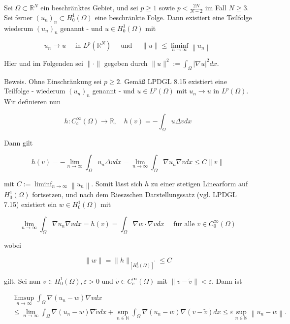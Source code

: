 \documentclass[10pt, letterpaper]{article}
\begin{document}
Sei $\Omega \subset \mathbb{R}^{N}$ ein beschränktes Gebiet, und sei $p \geq 1$ sowie $p<\frac{2 N}{N-2}$ im Fall $N \geq 3$. Sei ferner $\left(u_{n}\right)_{n} \subset H_{0}^{1}(\Omega)$ eine beschränkte Folge. Dann existiert eine Teilfolge wiederum $\left(u_{n}\right)_{n}$ genannt - und $u \in H_{0}^{1}(\Omega)$ mit

$$
u_{n} \rightarrow u \quad \text { in } L^{p}\left(\mathbb{R}^{N}\right) \quad \text { und } \quad\|u\| \leq \liminf _{n \rightarrow \infty}\left\|u_{n}\right\|
$$

Hier und im Folgenden sei $\|\cdot\|$ gegeben durch $\|u\|^{2}:=\int_{\Omega}|\nabla u|^{2} d x$.

Beweis. Ohne Einschränkung sei $p \geq 2$. Gemäß LPDGL 8.15 existiert eine Teilfolge - wiederum $\left(u_{n}\right)_{n}$ genannt - und $u \in L^{p}(\Omega)$ mit $u_{n} \rightarrow u$ in $L^{p}(\Omega)$. Wir definieren nun

$$
h: C_{c}^{\infty}(\Omega) \rightarrow \mathbb{R}, \quad h(v)=-\int_{\Omega} u \Delta v d x
$$

Dann gilt

$$
h(v)=-\lim _{n \rightarrow \infty} \int_{\Omega} u_{n} \Delta v d x=\lim _{n \rightarrow \infty} \int_{\Omega} \nabla u_{n} \nabla v d x \leq C\|v\|
$$

mit $C:=\liminf _{n \rightarrow \infty}\left\|u_{n}\right\|$. Somit lässt sich $h$ zu einer stetigen Linearform auf $H_{0}^{1}(\Omega)$ fortsetzen, und nach dem Rieszschen Darstellungssatz (vgl. LPDGL 7.15) existiert ein $w \in H_{0}^{1}(\Omega)$ mit

$$
\lim _{n \rightarrow \infty} \int_{\Omega} \nabla u_{n} \nabla v d x=h(v)=\int_{\Omega} \nabla w \cdot \nabla v d x \quad \text { für alle } v \in C_{0}^{\infty}(\Omega)
$$

wobei

$$
\|w\|=\|h\|_{\left[H_{0}^{1}(\Omega)\right]^{\prime}} \leq C
$$

gilt. Sei nun $v \in H_{0}^{1}(\Omega), \varepsilon>0$ und $\tilde{v} \in C_{c}^{\infty}(\Omega)$ mit $\|v-\tilde{v}\|<\varepsilon$. Dann ist

$$
\begin{aligned}
& \limsup _{n \rightarrow \infty} \int_{\Omega} \nabla\left(u_{n}-w\right) \nabla v d x \\
& \leq \lim _{n \rightarrow \infty} \int_{\Omega} \nabla\left(u_{n}-w\right) \nabla \tilde{v} d x+\sup _{n \in \mathbb{N}} \int_{\Omega} \nabla\left(u_{n}-w\right) \nabla(v-\tilde{v}) d x \leq \varepsilon \sup _{n \in \mathbb{N}}\left\|u_{n}-w\right\| .
\end{aligned}
$$
\end{document}
